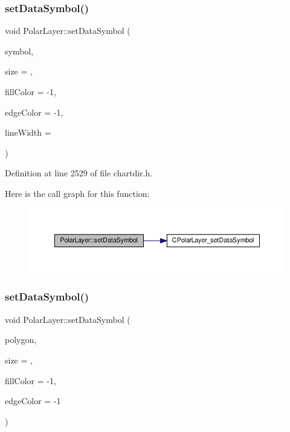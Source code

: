 \subsubsection{\texorpdfstring{set\+Data\+Symbol()}{setDataSymbol()}\hspace{0.1cm}{\footnotesize\ttfamily [3/4]}}
{\footnotesize\ttfamily void Polar\+Layer\+::set\+Data\+Symbol (\begin{DoxyParamCaption}\item[{int}]{symbol,  }\item[{int}]{size = {},  }\item[{int}]{fill\+Color = {\ttfamily -\/1},  }\item[{int}]{edge\+Color = {\ttfamily -\/1},  }\item[{int}]{line\+Width = {} }\end{DoxyParamCaption})\hspace{0.3cm}{\ttfamily [inline]}}



Definition at line 2529 of file chartdir.\+h.

Here is the call graph for this function\+:
\nopagebreak
\begin{figure}[H]
\begin{center}
\leavevmode
\includegraphics[width=350pt]{class_polar_layer_a6c2df34e76a9ed25cfa42e1d37d782a3_cgraph}
\end{center}
\end{figure}
\mbox{\label{class_polar_layer_aed7d56050c359edaaf332732355f80f1}} 
\subsubsection{\texorpdfstring{set\+Data\+Symbol()}{setDataSymbol()}\hspace{0.1cm}{\footnotesize\ttfamily [4/4]}}
{\footnotesize\ttfamily void Polar\+Layer\+::set\+Data\+Symbol (\begin{DoxyParamCaption}\item[{\hyperlink{class_int_array}{Int\+Array}}]{polygon,  }\item[{int}]{size = {},  }\item[{int}]{fill\+Color = {\ttfamily -\/1},  }\item[{int}]{edge\+Color = {\ttfamily -\/1} }\end{DoxyParamCaption})\hspace{0.3cm}{\ttfamily [inline]}}



